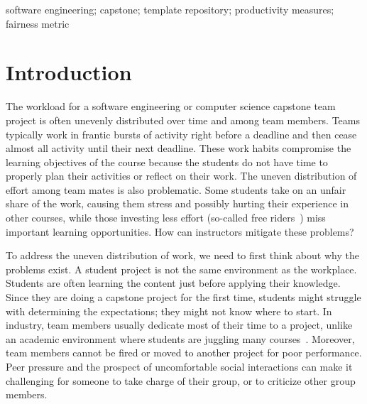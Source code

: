 \documentclass[10pt, conference]{IEEEtran}
\begin{document}
\begin{IEEEkeywords}
software engineering; capstone; template repository; productivity measures;
fairness metric
\end{IEEEkeywords}

\section{Introduction} \label{SecIntro}

The workload for a software engineering or computer science capstone team
project is often unevenly distributed over time and among team members.  Teams
typically work in frantic bursts of activity right before a deadline and then
cease almost all activity until their next deadline.  These work habits
compromise the learning objectives of the course because the students do not
have time to properly plan their activities or reflect on their work.  The
uneven distribution of effort among team mates is also problematic.  Some
students take on an unfair share of the work, causing them stress and possibly
hurting their experience in other courses, while those investing less effort
(so-called free riders~\cite{tushevUsingGitHubLarge2020}) miss important
learning opportunities.  How can instructors mitigate these problems?

To address the uneven distribution of work, we need to first think about why the
problems exist.  A student project is not the same environment as the workplace.
Students are often learning the content just before applying their knowledge.
Since they are doing a capstone project for the first time, students might
struggle with determining the expectations; they might not know where to start.
In industry, team members usually dedicate most of their time to a project, unlike
an academic environment where students are juggling many
courses~\cite{connReusableAcademicstrengthMetricsbased2004}. Moreover, team
members cannot be fired or moved to another project for poor performance.  Peer
pressure and the prospect of uncomfortable social interactions can make it
challenging for someone to take charge of their group, or to criticize other
group members. %

\end{document}
